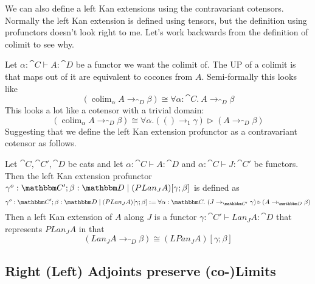 \documentclass{article}
\DeclareMathOperator*{\colim}{colim}
\begin{document}
We can also define a left Kan extensions using the contravariant
cotensors.  Normally the left Kan extension is defined using tensors,
but the definition using profunctors doesn't look right to me. Let's
work backwards from the definition of colimit to see why.

Let $\alpha : \cat C \vdash A : \cat D$ be a functor we want the
colimit of. The UP of a colimit is that maps out of it are equivalent
to cocones from $A$. Semi-formally this looks like
\[ (\colim_{\alpha} A \to_{\cat D} \beta) \cong \forall \alpha:\cat C.~ A \to_{\cat D} \beta \]
This looks a lot like a cotensor with a trivial domain:
\[ (\colim_{\alpha} A \to_{\cat D} \beta) \cong \forall \alpha. (() \to_{1} \gamma) \triangleright (A \to_{\cat D} \beta) \]
Suggesting that we define the left Kan extension profunctor as a
contravariant cotensor as follows.
\begin{definition}
  Let $\cat C,\cat C',\cat D$ be cats and let $\alpha:\cat C \vdash A
  : \cat D$ and $\alpha : \cat C \vdash J : \cat C'$ be functors.
  Then the left Kan extension profunctor $\gamma^o:\cat C'; \beta:\cat
  D \pipe (PLan_J A)[\gamma;\beta]$ is defined as
  \[
  \gamma^o:\cat C'; \beta:\cat D \pipe (PLan_J A)[\gamma;\beta]
  := \forall \alpha : \cat C.~ (J \to_{\cat C'} \gamma) \triangleright (A \to_{\cat D} \beta)
  \]
  Then a left Kan extension of $A$ along $J$ is a functor $\gamma :
  \cat C' \vdash Lan_J A : \cat D$ that represents $PLan_J A$ in that
  \[ (Lan_J A \to_{\cat D} \beta) \cong (LPan_J A)[\gamma;\beta] \]
\end{definition}



\subsection{Right (Left) Adjoints preserve (co-)Limits}
\end{document}

